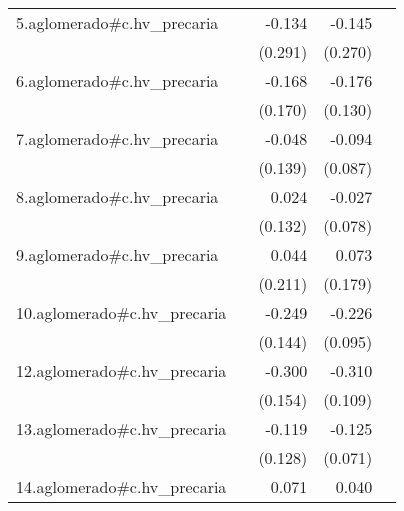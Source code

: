 {\begin{longtable}{l*{4}{D{.}{.}{-1}}}
\addlinespace
5.aglomerado#c.hv\_precaria&                     &      -0.134         &      -0.145         &                     \\
            &                     &     (0.291)         &     (0.270)         &                     \\
\addlinespace
6.aglomerado#c.hv\_precaria&                     &      -0.168         &      -0.176         &                     \\
            &                     &     (0.170)         &     (0.130)         &                     \\
\addlinespace
7.aglomerado#c.hv\_precaria&                     &      -0.048         &      -0.094         &                     \\
            &                     &     (0.139)         &     (0.087)         &                     \\
\addlinespace
8.aglomerado#c.hv\_precaria&                     &       0.024         &      -0.027         &                     \\
            &                     &     (0.132)         &     (0.078)         &                     \\
\addlinespace
9.aglomerado#c.hv\_precaria&                     &       0.044         &       0.073         &                     \\
            &                     &     (0.211)         &     (0.179)         &                     \\
\addlinespace
10.aglomerado#c.hv\_precaria&                     &      -0.249         &      -0.226\sym{*}  &                     \\
            &                     &     (0.144)         &     (0.095)         &                     \\
\addlinespace
12.aglomerado#c.hv\_precaria&                     &      -0.300         &      -0.310\sym{**} &                     \\
            &                     &     (0.154)         &     (0.109)         &                     \\
\addlinespace
13.aglomerado#c.hv\_precaria&                     &      -0.119         &      -0.125         &                     \\
            &                     &     (0.128)         &     (0.071)         &                     \\
\addlinespace
14.aglomerado#c.hv\_precaria&                     &       0.071         &       0.040         &                     \\

\end{longtable}}
